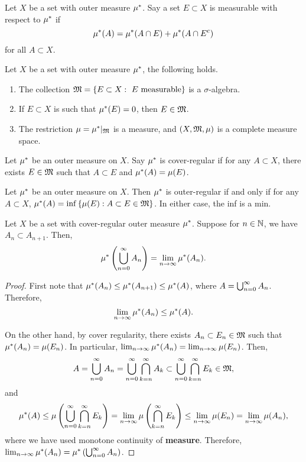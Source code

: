 \documentclass[a4paper]{article}
\begin{document}
\begin{defi}
  Let $X$ be a set with outer measure $\mu^*$. Say 
  a set $E \subset X$ is measurable with respect to 
  $\mu^*$ if 
  \[
  \mu^*(A) = \mu^*(A \cap E) + \mu^*(A \cap E^c) 
  \]
  for all $A \subset X$.
\end{defi}

\begin{thm}
  Let $X$ be a set with outer measure $\mu^*$, the following 
  holds. 
  \begin{enumerate}
    \item The collection $\mathfrak{M} = \left\{ E \subset X: \text{ 
      $E$ measurable} \right\}$ 
      is a $\sigma$-algebra.
    \item If $E \subset X$ is such that $\mu^*(E) = 0$, then 
    $E \in \mathfrak{M}$.
    \item The restriction $\mu = \mu^* \vert_{\mathfrak{M}}$ is a measure, 
    and $(X, \mathfrak{M}, \mu)$ is a complete measure space.
  \end{enumerate}
\end{thm}

\begin{defi}
  Let $\mu^*$ be an outer measure on $X$. Say $\mu^*$
  is cover-regular if for any $A \subset X$, there 
  exists $E \in \mathfrak{M}$ such that $A \subset E$ 
  and $\mu^*(A) = \mu(E)$.
\end{defi}

\begin{prop}
  Let $\mu^*$ be an outer measure on $X$. Then $\mu^*$
  is outer-regular if and only if for any $A \subset X$, 
  $\mu^*(A) = \inf \left\{ \mu(E) : A \subset E \in 
  \mathfrak{M} \right\}$. In either case, the inf is a min.
\end{prop}

\begin{prop}
  Let $X$ be a set with cover-regular outer measure 
  $\mu^*$. Suppose for $n \in \mathbb{N}$, we have $A_n \subset 
  A_{n+1}$. Then, 
  \[
  \mu^* \left( \bigcup_{n=0}^\infty A_n \right) 
  = \lim_{n \to \infty} \mu^*(A_n).
  \]
\end{prop}

\begin{proof}
  First note that $\mu^*(A_n) \leq \mu^*(A_{n+1}) 
  \leq \mu^*(A)$, where $A = \bigcup_{n=0}^\infty A_n$. 
  Therefore, 
  \[
    \lim_{n \to \infty} \mu^*(A_n) \leq \mu^*(A).
  \]

  On the other hand, by cover regularity, there exists 
  $A_n \subset E_n \in \mathfrak{M}$ such that $\mu^*(A_n) = \mu(E_n)$.
  In particular, $\lim_{n \to \infty} \mu^* (A_n) 
  = \lim_{n \to \infty} \mu(E_n)$. Then, 
  \[
  A = \bigcup_{n=0}^\infty A_n = \bigcup_{n=0}^\infty \bigcap_{k=n}^\infty A_k
  \subset \bigcup_{n=0}^\infty \bigcap_{k=n}^\infty E_k \in \mathfrak{M},
  \]
  and 
  \[
  \begin{aligned}
    \mu^*(A) 
    \leq \mu \left( \bigcup_{n=0}^\infty 
    \bigcap_{k=n}^\infty E_k \right) 
    = \lim_{n \to \infty} \mu \left( \bigcap_{k=n}^\infty 
    E_k \right) 
    \leq \lim_{n \to \infty} \mu (E_n) 
    = \lim_{n \to \infty} \mu(A_n),
  \end{aligned}
  \]
  where we have used monotone continuity of \textbf{measure}.
  Therefore, $\lim_{n \to \infty} \mu^* (A_n) = \mu^* 
  \left( \bigcup_{n=0}^\infty A_n \right)$.
\end{proof}
\end{document}

